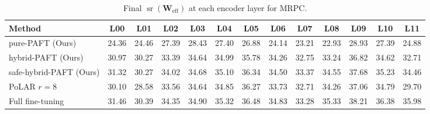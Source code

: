 \begin{table}[t]
\centering
\small
\setlength{\tabcolsep}{3pt}
\caption{Final $\operatorname{sr}(\mathbf{W}_{\text{eff}})$ at each encoder layer for \textsc{MRPC}.}
\label{tab:per_layer_mrpc}
\begin{tabular}{lcccccccccccc}
\toprule
\textbf{Method} & \textbf{L00} & \textbf{L01} & \textbf{L02} & \textbf{L03} & \textbf{L04} & \textbf{L05} & \textbf{L06} & \textbf{L07} & \textbf{L08} & \textbf{L09} & \textbf{L10} & \textbf{L11} \\
\midrule
pure-PAFT (Ours) & 24.36 & 24.46 & 27.39 & 28.43 & 27.40 & 26.88 & 24.14 & 23.21 & 22.93 & 28.93 & 27.39 & 24.88 \\
hybrid-PAFT (Ours) & 30.97 & 30.27 & 33.39 & 34.64 & 34.99 & 35.78 & 34.26 & 32.75 & 33.24 & 36.82 & 34.62 & 32.71 \\
safe-hybrid-PAFT (Ours) & 31.32 & 30.27 & 34.02 & 34.68 & 35.10 & 36.34 & 34.50 & 33.37 & 34.55 & 37.68 & 35.23 & 34.46 \\
PoLAR $r{=}8$ & 30.10 & 28.58 & 33.56 & 34.64 & 34.85 & 36.27 & 33.73 & 32.71 & 34.26 & 37.06 & 34.79 & 29.70 \\
Full fine-tuning & 31.46 & 30.39 & 34.35 & 34.90 & 35.32 & 36.48 & 34.83 & 33.28 & 35.33 & 38.21 & 36.38 & 35.98 \\
\bottomrule
\end{tabular}
\end{table}